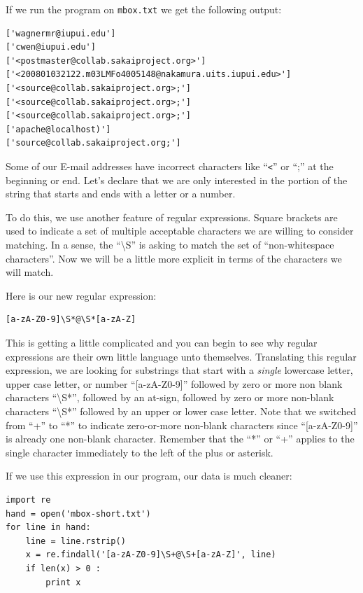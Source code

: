 \documentclass[11pt]{book}
\begin{document}
If we run the program on {\tt mbox.txt} we get the following output:

\beforeverb
\begin{verbatim}
['wagnermr@iupui.edu']
['cwen@iupui.edu']
['<postmaster@collab.sakaiproject.org>']
['<200801032122.m03LMFo4005148@nakamura.uits.iupui.edu>']
['<source@collab.sakaiproject.org>;']
['<source@collab.sakaiproject.org>;']
['<source@collab.sakaiproject.org>;']
['apache@localhost)']
['source@collab.sakaiproject.org;']
\end{verbatim}
\afterverb
%
Some of our E-mail addresses have incorrect characters like ``\verb"<"'' or ``;'' at the beginning or end.   Let's declare that we are only interested in the portion of the string that starts and ends with a letter or a number.

To do this, we use another feature of regular expressions.  Square brackets are used to indicate a set of multiple acceptable characters we are willing to consider matching.  In a sense, the ``{\textbackslash}S'' is asking to match the set of ``non-whitespace characters''.  Now we will be a little more explicit in terms of the characters we will match.

Here is our new regular expression:

\beforeverb
\begin{verbatim}
[a-zA-Z0-9]\S*@\S*[a-zA-Z]
\end{verbatim}
\afterverb
%
This is getting a little complicated and you can begin to see why regular expressions are their own little language unto themselves.  Translating this regular expression, we are looking for substrings that start with a {\em single} lowercase letter, upper case letter, or number ``[a-zA-Z0-9]'' followed by zero or more non blank characters ``{\textbackslash}S*'', followed by an at-sign, followed by zero or more non-blank characters ``{\textbackslash}S*'' followed by an upper or lower case letter.  Note that we switched from ``+'' to ``*'' to indicate zero-or-more non-blank characters since ``[a-zA-Z0-9]'' is already one non-blank character.   Remember that the ``*'' or ``+'' applies to the single character immediately to the left of the plus or asterisk.

If we use this expression in our program, our data is much cleaner:

\beforeverb
\begin{verbatim}
import re
hand = open('mbox-short.txt')
for line in hand:
    line = line.rstrip()
    x = re.findall('[a-zA-Z0-9]\S+@\S+[a-zA-Z]', line)
    if len(x) > 0 :
        print x
\end{verbatim}
\afterverb
%
\end{document}
